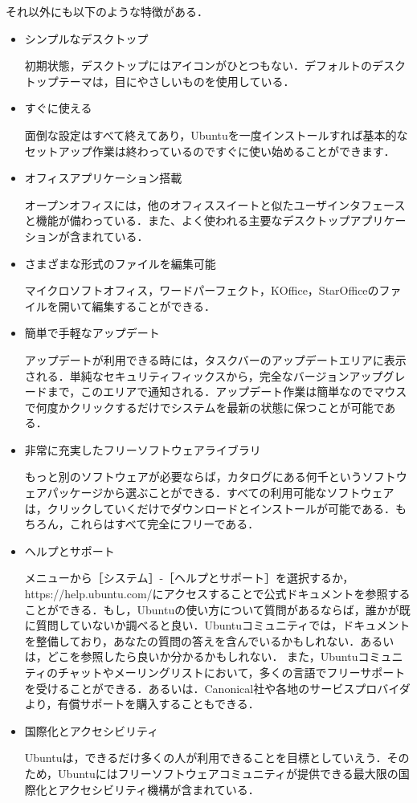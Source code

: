 それ以外にも以下のような特徴がある．
\begin{itemize}
  \item シンプルなデスクトップ

初期状態，デスクトップにはアイコンがひとつもない．デフォルトのデスクトップテーマは，目にやさしいものを使用している．

  \item すぐに使える

面倒な設定はすべて終えてあり，Ubuntuを一度インストールすれば基本的なセットアップ作業は終わっているのですぐに使い始めることができます．

  \item オフィスアプリケーション搭載

オープンオフィスには，他のオフィススイートと似たユーザインタフェースと機能が備わっている．また、よく使われる主要なデスクトップアプリケーションが含まれている．
　
  \item さまざまな形式のファイルを編集可能

マイクロソフトオフィス，ワードパーフェクト，KOffice，StarOfficeのファイルを開いて編集することができる．

  \item 簡単で手軽なアップデート

アップデートが利用できる時には，タスクバーのアップデートエリアに表示される．単純なセキュリティフィックスから，完全なバージョンアップグレードまで，このエリアで通知される．アップデート作業は簡単なのでマウスで何度かクリックするだけでシステムを最新の状態に保つことが可能である．

  \item 非常に充実したフリーソフトウェアライブラリ

もっと別のソフトウェアが必要ならば，カタログにある何千というソフトウェアパッケージから選ぶことができる．すべての利用可能なソフトウェアは，クリックしていくだけでダウンロードとインストールが可能である．もちろん，これらはすべて完全にフリーである．

  \item ヘルプとサポート

メニューから［システム］-［ヘルプとサポート］を選択するか，https://help.ubuntu.com/にアクセスすることで公式ドキュメントを参照することができる．もし，Ubuntuの使い方について質問があるならば，誰かが既に質問していないか調べると良い．Ubuntuコミュニティでは，ドキュメントを整備しており，あなたの質問の答えを含んでいるかもしれない．あるいは，どこを参照したら良いか分かるかもしれない．
また，Ubuntuコミュニティのチャットやメーリングリストにおいて，多くの言語でフリーサポートを受けることができる．あるいは．Canonical社や各地のサービスプロバイダより，有償サポートを購入することもできる．

  \item 国際化とアクセシビリティ

Ubuntuは，できるだけ多くの人が利用できることを目標としていえう．そのため，Ubuntuにはフリーソフトウェアコミュニティが提供できる最大限の国際化とアクセシビリティ機構が含まれている\cite{tokutyou}．


\end{itemize}
